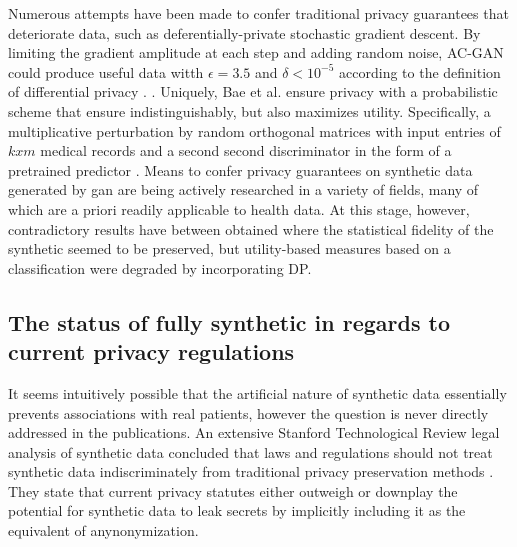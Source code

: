 Numerous attempts have been made to confer traditional privacy guarantees that deteriorate data, such as deferentially-private stochastic gradient descent. By limiting the gradient amplitude at each step and adding random noise, AC-GAN could produce useful data witth $\epsilon=3.5$ and $\delta<10^{-5}$ according to the definition of differential privacy \cite{Beaulieu-Jones2019-ct, esteban2017real,chincheong2020generation}. \cite{BaeAnomiGAN2020}. Uniquely, Bae et al. ensure privacy with a probabilistic scheme that ensure indistinguishably, but also maximizes utility. Specifically, a multiplicative perturbation by random orthogonal matrices with input entries of $k x m$ medical records and a second second discriminator in the form of a pretrained  predictor \cite{BaeAnomiGAN2020}. Means to confer privacy guarantees on synthetic data generated by \gls{gan} are being actively researched in a variety of fields, many of which are a priori readily applicable to health data. At this stage, however, contradictory results have between obtained where the statistical fidelity of the synthetic seemed to be preserved, but utility-based measures based on a classification were degraded by incorporating DP.\par
\subsection{The status of fully synthetic in regards to current privacy regulations}
It seems intuitively possible that the artificial nature of synthetic data essentially prevents associations with real patients, however the question is never directly addressed in the publications. An extensive Stanford Technological Review legal analysis of synthetic data concluded that laws and regulations should not treat synthetic data indiscriminately from traditional privacy preservation methods \cite{bellovin2019privacy}. They state that current privacy statutes either outweigh or downplay the potential for synthetic data to leak secrets by implicitly including it as the equivalent of anynonymization. 
